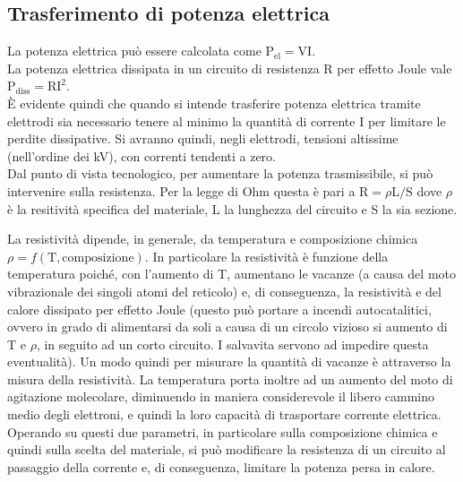 \subsection{Trasferimento di potenza elettrica}

La potenza elettrica può essere calcolata come $\mathrm{P_{el}}=\mathrm{VI}$. \\
La potenza elettrica dissipata in un circuito di resistenza R per effetto Joule vale $\mathrm{P_{diss} = \mathrm{RI^2}}$.\\
È evidente quindi che quando si intende trasferire potenza elettrica tramite elettrodi sia necessario tenere al minimo la quantità di corrente I per limitare le perdite dissipative. Si avranno quindi, negli elettrodi, tensioni altissime (nell'ordine dei kV), con correnti tendenti a zero.\\
Dal punto di vista tecnologico, per aumentare la potenza trasmissibile, si può intervenire sulla resistenza. Per la legge di Ohm questa è pari a $\mathrm{R} = \rho\mathrm{L/S}$ dove $\rho$ è la resitività specifica del materiale, L la lunghezza del circuito e S la sia sezione.

La resistività dipende, in generale, da temperatura e composizione chimica $\rho = f(\mathrm{T, composizione})$. In particolare la resistività è funzione della temperatura poiché, con l'aumento di T, aumentano le vacanze (a causa del moto vibrazionale dei singoli atomi del reticolo) e, di conseguenza, la resistività e del calore dissipato per effetto Joule (questo può portare a incendi autocatalitici, ovvero in grado di alimentarsi da soli a causa di un circolo vizioso si aumento di T e $\rho$, in seguito ad un corto circuito. I salvavita servono ad impedire questa eventualità). Un modo quindi per misurare la quantità di vacanze è attraverso la misura della resistività. La temperatura porta inoltre ad un aumento del moto di agitazione molecolare, diminuendo in maniera considerevole il libero cammino medio degli elettroni, e quindi la loro capacità di trasportare corrente elettrica.\\
Operando su questi due parametri, in particolare sulla composizione chimica e quindi sulla scelta del materiale, si può modificare la resistenza di un circuito al passaggio della corrente e, di conseguenza, limitare la potenza persa in calore.

